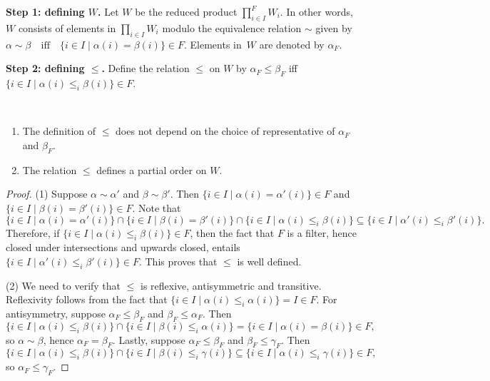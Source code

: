 \documentclass[submission,copyright,creativecommons]{eptcs}
\renewcommand{\iff}{\quad\text{iff}\quad}
\begin{document}
  \bigskip\noindent
  \textbf{Step 1: defining $W$.}
    Let $W$ be the reduced product $\prod_{i \in I}^F W_i$. In other words, $W$ consists
    of elements in $\prod_{i \in I} W_i$ modulo the equivalence relation $\sim$ given by
    $\alpha \sim \beta \iff \{ i \in I \mid \alpha(i) = \beta(i) \} \in F$.
    Elements in~$W$ are denoted by $\alpha_F$.

  \bigskip\noindent
  \textbf{Step 2: defining $\leq$.}
    Define the relation $\leq$ on $W$ by
    $\alpha_F \leq \beta_F$ iff $\{ i \in I \mid \alpha(i) \leq_i \beta(i) \} \in F$.

    \begin{lemma}\label{lem:B1} \
      \begin{enumerate}
        \item The definition of $\leq$ does not depend on the choice of 
              representative of $\alpha_F$ and $\beta_F$.
        \item The relation $\leq$ defines a partial order on $W$.
      \end{enumerate}
    \end{lemma}
    \begin{proof}
      (1) \; Suppose $\alpha \sim \alpha'$ and $\beta \sim \beta'$.
      Then $\{ i \in I \mid \alpha(i) = \alpha'(i) \} \in F$ and
      $\{ i \in I \mid \beta(i) = \beta'(i) \} \in F$. Note that
      \begin{equation*}
        \{ i \in I \mid \alpha(i) = \alpha'(i) \}
          \cap \{ i \in I \mid \beta(i) = \beta'(i) \}
          \cap \{ i \in I \mid \alpha(i) \leq_i \beta(i) \}
          \subseteq \{ i \in I \mid \alpha'(i) \leq_i \beta'(i) \}.
      \end{equation*}
      Therefore, if $\{ i \in I \mid \alpha(i) \leq_i \beta(i) \} \in F$, then
      the fact that $F$ is a filter, hence closed under intersections
      and upwards closed, entails
      $\{ i \in I \mid \alpha'(i) \leq_i \beta'(i) \} \in F$.
      This proves that $\leq$ is well defined.

      (2) \; We need to verify that $\leq$ is reflexive,
      antisymmetric and transitive.
      Reflexivity follows from the fact that $\{ i \in I \mid \alpha(i) \leq_i \alpha(i) \} = I \in F$.
      For antisymmetry, suppose $\alpha_F \leq \beta_F$ and
      $\beta_F \leq \alpha_F$. Then
      \begin{equation*}
        \{ i \in I \mid \alpha(i) \leq_i \beta(i) \}
          \cap \{ i \in I \mid \beta(i) \leq_i \alpha(i) \}
          = \{ i \in I \mid \alpha(i) = \beta(i) \} \in F,
      \end{equation*}
      so $\alpha \sim \beta$, hence $\alpha_F = \beta_F$.
      Lastly, suppose $\alpha_F \leq \beta_F$ and $\beta_F \leq \gamma_F$.
      Then
      \begin{equation*}
        \{ i \in I \mid \alpha(i) \leq_i \beta(i) \}
          \cap \{ i \in I \mid \beta(i) \leq_i \gamma(i) \}
          \subseteq \{ i \in I \mid \alpha(i) \leq_i \gamma(i) \} \in F,
      \end{equation*}
      so $\alpha_F \leq \gamma_F$.
    \end{proof}
\end{document}
